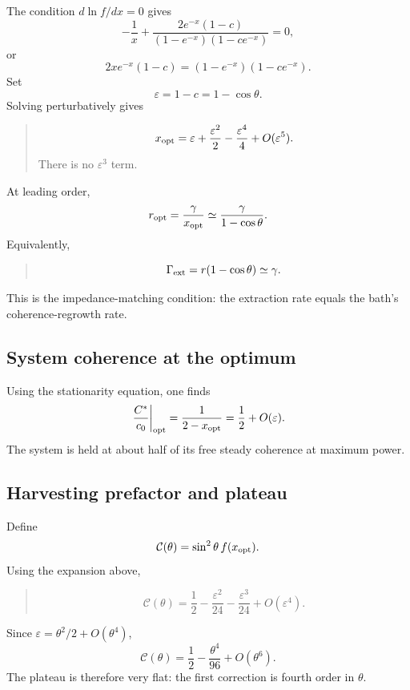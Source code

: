 \documentclass[11pt,a4paper]{article}
\newcommand{\eps}{\varepsilon}
\newenvironment{resultbox}{\begin{quote}\small}{\end{quote}}
\begin{document}
The condition $d\ln f/dx=0$ gives
\begin{equation}
-\frac1x+\frac{2e^{-x}(1-c)}{(1-e^{-x})(1-ce^{-x})}=0,
\end{equation}
or
\begin{equation}
2xe^{-x}(1-c)=(1-e^{-x})(1-ce^{-x}).
\end{equation}
Set
\begin{equation}
\eps=1-c=1-\cos\theta.
\end{equation}
Solving perturbatively gives
\begin{resultbox}
\begin{equation}
x_{\rm opt}=\eps+\frac{\eps^2}{2}-\frac{\eps^4}{4}+O(\eps^5).
\end{equation}
There is no $\eps^3$ term.
\end{resultbox}
At leading order,
\begin{equation}
r_{\rm opt}=\frac{\gamma}{x_{\rm opt}}\simeq \frac{\gamma}{1-\cos\theta}.
\end{equation}
Equivalently,
\begin{resultbox}
\begin{equation}
\Gamma_{\rm ext}=r(1-\cos\theta)\simeq \gamma.
\end{equation}
\end{resultbox}
This is the impedance-matching condition: the extraction rate equals the bath's coherence-regrowth rate.

\subsection{System coherence at the optimum}

Using the stationarity equation, one finds
\begin{equation}
\left.\frac{C^*}{c_0}\right|_{\rm opt}=\frac{1}{2-x_{\rm opt}}=\frac12+O(\eps).
\end{equation}
The system is held at about half of its free steady coherence at maximum power.

\subsection{Harvesting prefactor and plateau}

Define
\begin{equation}
\mathcal C(\theta)=\sin^2\theta\,f(x_{\rm opt}).
\end{equation}
Using the expansion above,
\begin{resultbox}
\begin{equation}
\mathcal C(\theta)=\frac12-\frac{\eps^2}{24}-\frac{\eps^3}{24}+O(\eps^4).
\end{equation}
\end{resultbox}
Since $\eps=\theta^2/2+O(\theta^4)$,
\begin{equation}
\mathcal C(\theta)=\frac12-\frac{\theta^4}{96}+O(\theta^6).
\end{equation}
The plateau is therefore very flat: the first correction is fourth order in $\theta$.
\end{document}
